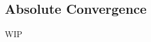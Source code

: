 \documentclass[../poma-notes.tex]{subfiles}
\begin{document}
\subsection*{Absolute Convergence}

WIP
\end{document}
